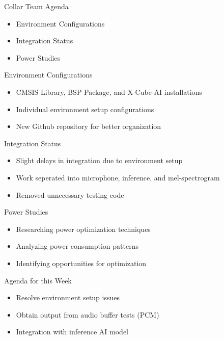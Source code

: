 \begin{frame}{Collar Team Agenda}
    \begin{itemize}
        \item Environment Configurations
        \item Integration Status
        \item Power Studies
    \end{itemize}
\end{frame}

\begin{frame}{Environment Configurations}
    \begin{itemize}
        \item CMSIS Library, BSP Package, and X-Cube-AI installations
        \item Individual environment setup configurations
        \item New Github repository for better organization
    \end{itemize}
\end{frame}

\begin{frame}{Integration Status}
    \begin{itemize}
        \item Slight delays in integration due to environment setup
        \item Work seperated into microphone, inference, and mel-spectrogram
        \item Removed unnecessary testing code
    \end{itemize}   
\end{frame}

\begin{frame}{Power Studies}
    \begin{itemize}
        \item Researching power optimization techniques
        \item Analyzing power consumption patterns
        \item Identifying opportunities for optimization
    \end{itemize}
\end{frame}

\begin{frame}{Agenda for this Week}
    \begin{itemize}
        \item Resolve environment setup issues
        \item Obtain output from audio buffer tests (PCM)
        \item Integration with inference AI model
    \end{itemize}    
\end{frame}

